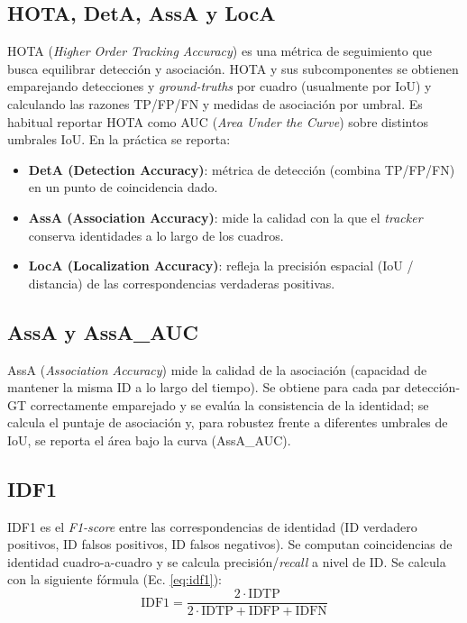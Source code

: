 \subsection{HOTA, DetA, AssA y LocA}
HOTA \cite{HOTA} (\textit{Higher Order Tracking Accuracy}) es una métrica de seguimiento que busca equilibrar detección y asociación. HOTA y sus subcomponentes se obtienen emparejando detecciones y \textit{ground-truths} por cuadro (usualmente por IoU) y calculando las razones TP/FP/FN y medidas de asociación por umbral. Es habitual reportar HOTA como AUC (\textit{Area Under the Curve}) sobre distintos umbrales IoU. En la práctica se reporta:
\begin{itemize}
  \setlength{\itemsep}{0pt}%
  \setlength{\parskip}{0pt}%
  \setlength{\parsep}{0pt}%
  \item \textbf{DetA (Detection Accuracy)}: métrica de detección (combina TP/FP/FN) en un punto de coincidencia dado.
  \item \textbf{AssA (Association Accuracy)}: mide la calidad con la que el \textit{tracker} conserva identidades a lo largo de los cuadros.
  \item \textbf{LocA (Localization Accuracy)}: refleja la precisión espacial (IoU / distancia) de las correspondencias verdaderas positivas.
\end{itemize}

\subsection{AssA y AssA\_AUC}
AssA \cite{HOTA} (\textit{Association Accuracy}) mide la calidad de la asociación (capacidad de mantener la misma ID a lo largo del tiempo). Se obtiene para cada par detección-GT correctamente emparejado y se evalúa la consistencia de la identidad; se calcula el puntaje de asociación y, para robustez frente a diferentes umbrales de IoU, se reporta el área bajo la curva (AssA\_AUC).  

\subsection{IDF1}
IDF1 \cite{IDF1} es el \textit{F1-score} entre las correspondencias de identidad (ID verdadero positivos, ID falsos positivos, ID falsos negativos). Se computan coincidencias de identidad cuadro-a-cuadro y se calcula precisión/\textit{recall} a nivel de ID. Se calcula con la siguiente fórmula (Ec. \ref{eq:idf1}):
\begin{equation}
\text{IDF1} = \frac{2 \cdot \text{IDTP}}{2\cdot\text{IDTP} + \text{IDFP} + \text{IDFN}}
\label{eq:idf1}
\end{equation}

